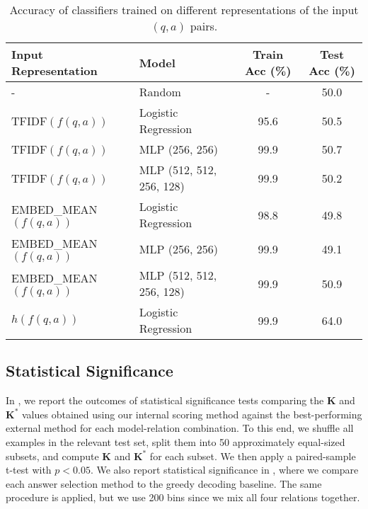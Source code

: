\begin{table}[h!]
\centering
\small
\begin{tabular}{l l c c}
\toprule
\textbf{Input Representation} & \textbf{Model} & \textbf{Train Acc (\%)} & \textbf{Test Acc (\%)} \\
\midrule
- & Random & - & 50.0 \\
\midrule
TFIDF$(f(q,a))$ & Logistic Regression & 95.6 & 50.5 \\
TFIDF$(f(q,a))$ & MLP (256, 256) & 99.9 & 50.7 \\
TFIDF$(f(q,a))$ & MLP (512, 512, 256, 128) & 99.9 & 50.2 \\
\midrule
EMBED\_MEAN$(f(q,a))$ & Logistic Regression & 98.8 & 49.8 \\
EMBED\_MEAN$(f(q,a))$ & MLP (256, 256) & 99.9 & 49.1 \\
EMBED\_MEAN$(f(q,a))$ & MLP (512, 512, 256, 128) & 99.9 & 50.9 \\
\midrule
$h(f(q,a))$ & Logistic Regression & 99.9 & 64.0 \\
\bottomrule
\end{tabular}
\caption{Accuracy of classifiers trained on different representations of the input $(q,a)$ pairs.}
\label{tab:memorization_check}
\end{table}





\subsection{Statistical Significance}
\label{sec:statistic_significance}


In , we report the outcomes of statistical significance tests comparing the $\mathbf{K}$ and $\mathbf{K^\ast}$ values obtained using our internal scoring method against the best-performing external method for each model-relation combination. To this end, we shuffle all examples in the relevant test set, split them into 50 approximately equal-sized subsets, and compute $\mathbf{K}$ and $\mathbf{K^\ast}$ for each subset. We then apply a paired-sample t-test with \(p < 0.05\). We also report statistical significance in , where we compare each answer selection method to the greedy decoding baseline. The same procedure is applied, but we use 200 bins since we mix all four relations together.





